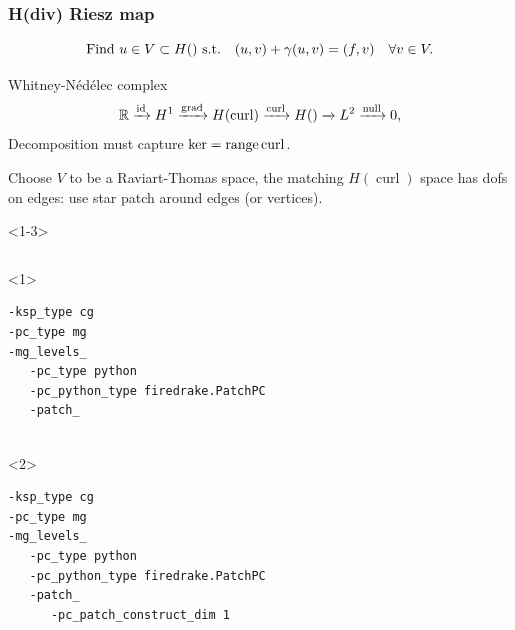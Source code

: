 \documentclass[presentation,aspectratio=43, 10pt]{beamer}
\DeclareMathOperator{\grad}{grad}
\let\div\relax
\DeclareMathOperator{\div}{div}
\DeclareMathOperator{\curl}{curl}
\DeclareMathOperator{\range}{range}
\begin{document}
\begin{frame}[fragile, t]
  \frametitle{H(div) Riesz map}
  \vspace{-1.5\baselineskip}
  \begin{equation*}
    \text{Find $u \in V \subset H(\div)$ s.t.}\quad (u, v) + \gamma (\div u, \div v) = (f, v) \quad \forall v \in V.
  \end{equation*}
  \vspace*{-\baselineskip}
  \begin{block}{Whitney-N\'ed\'elec complex}
    \begin{equation*}
      \mathbb{R} \xrightarrow{\operatorname{id}} H^1 \xrightarrow{\grad} H(\curl)
      \xrightarrow{\curl} H(\div) \xrightarrow{\div} L^2 \xrightarrow{\operatorname{null}} 0,
    \end{equation*}
    Decomposition must capture $\ker \div = \range \curl$.

    Choose $V$ to be a Raviart-Thomas space, the matching $H(\curl)$
    space has dofs on edges: use star patch around edges (or vertices).
  \end{block}
  \begin{onlyenv}<1-3>
    \begin{columns}[T]
      \begin{column}{0.6\textwidth}
        \begin{onlyenv}<1>
\begin{verbatim}
-ksp_type cg
-pc_type mg
-mg_levels_
   -pc_type python
   -pc_python_type firedrake.PatchPC
   -patch_


\end{verbatim}
        \end{onlyenv}
        \begin{onlyenv}<2>
\begin{verbatim}
-ksp_type cg
-pc_type mg
-mg_levels_
   -pc_type python
   -pc_python_type firedrake.PatchPC
   -patch_
      -pc_patch_construct_dim 1


\end{verbatim}
\end{onlyenv}
\end{column}
\end{columns}
\end{onlyenv}
\end{frame}
\end{document}

